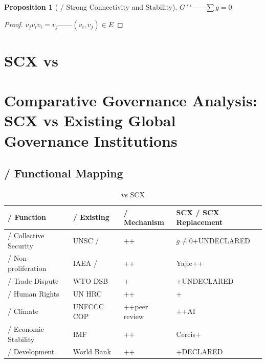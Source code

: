 \documentclass[12pt,a4paper]{article}
\newtheorem{proposition}[theorem]{Proposition}
\theoremstyle{remark}
\begin{document}
\begin{proposition}[ / Strong Connectivity and Stability]
    $G$""——$\sum g = 0$
\end{proposition}

\begin{proof}
    $v_j$$v_i$$v_i = v_j$——$(v_i, v_j) \in E$
\end{proof}


\section{SCX vs }
\section{Comparative Governance Analysis: SCX vs Existing Global Governance Institutions}

\subsection{ / Functional Mapping}

\begin{table}[H]
\centering
\begin{tabular}{p{2.5cm} p{4cm} p{4cm} p{4cm}}
    \toprule
    \textbf{ / Function} & \textbf{ / Existing} & \textbf{ / Mechanism} & \textbf{SCX / SCX Replacement} \\
    \midrule
     / Collective Security & UNSC /  & ++ & $g \neq 0$+UNDECLARED \\
    \midrule
     / Non-proliferation & IAEA /  & ++ & Yajie++ \\
    \midrule
     / Trade Dispute & WTO DSB & + & +UNDECLARED \\
    \midrule
     / Human Rights & UN HRC & ++ & + \\
    \midrule
     / Climate & UNFCCC COP & ++peer review & ++AI \\
    \midrule
     / Economic Stability & IMF & ++ & Cercis+ \\
    \midrule
     / Development & World Bank & ++ & +DECLARED \\
    \bottomrule
\end{tabular}
\caption{ vs SCX}
\end{table}
\end{document}
